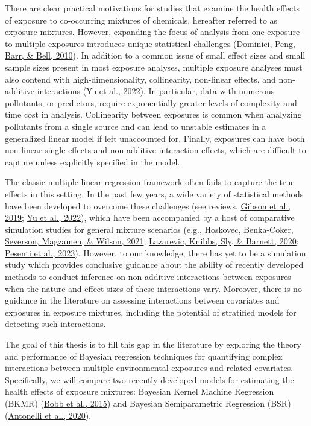 \documentclass[12pt, twoside]{amherstthesis}
\begin{document}
There are clear practical motivations for studies that examine the health effects of exposure to co-occurring mixtures of chemicals, hereafter referred to as exposure mixtures. However, expanding the focus of analysis from one exposure to multiple exposures introduces unique statistical challenges (\protect\hyperlink{ref-dominici_protecting_2010}{Dominici, Peng, Barr, \& Bell, 2010}). In addition to a common issue of small effect sizes and small sample sizes present in most exposure analyses, multiple exposure analyses must also contend with high-dimensionality, collinearity, non-linear effects, and non-additive interactions (\protect\hyperlink{ref-yu_review_2022}{Yu et al., 2022}). In particular, data with numerous pollutants, or predictors, require exponentially greater levels of complexity and time cost in analysis. Collinearity between exposures is common when analyzing pollutants from a single source and can lead to unstable estimates in a generalized linear model if left unaccounted for. Finally, exposures can have both non-linear single effects and non-additive interaction effects, which are difficult to capture unless explicitly specified in the model.

The classic multiple linear regression framework often fails to capture the true effects in this setting. In the past few years, a wide variety of statistical methods have been developed to overcome these challenges (see reviews, \protect\hyperlink{ref-gibson_overview_2019}{Gibson et al., 2019}; \protect\hyperlink{ref-yu_review_2022}{Yu et al., 2022}), which have been accompanied by a host of comparative simulation studies for general mixture scenarios (e.g., \protect\hyperlink{ref-hoskovec_model_2021}{Hoskovec, Benka-Coker, Severson, Magzamen, \& Wilson, 2021}; \protect\hyperlink{ref-lazarevic_performance_2020}{Lazarevic, Knibbs, Sly, \& Barnett, 2020}; \protect\hyperlink{ref-pesenti_comparative_2023}{Pesenti et al., 2023}). However, to our knowledge, there has yet to be a simulation study which provides conclusive guidance about the ability of recently developed methods to conduct inference on non-additive interactions between exposures when the nature and effect sizes of these interactions vary. Moreover, there is no guidance in the literature on assessing interactions between covariates and exposures in exposure mixtures, including the potential of stratified models for detecting such interactions.

The goal of this thesis is to fill this gap in the literature by exploring the theory and performance of Bayesian regression techniques for quantifying complex interactions between multiple environmental exposures and related covariates. Specifically, we will compare two recently developed models for estimating the health effects of exposure mixtures: Bayesian Kernel Machine Regression (BKMR) (\protect\hyperlink{ref-bobb_bayesian_2015}{Bobb et al., 2015}) and Bayesian Semiparametric Regression (BSR) (\protect\hyperlink{ref-antonelli_estimating_2020}{Antonelli et al., 2020}).
\end{document}
